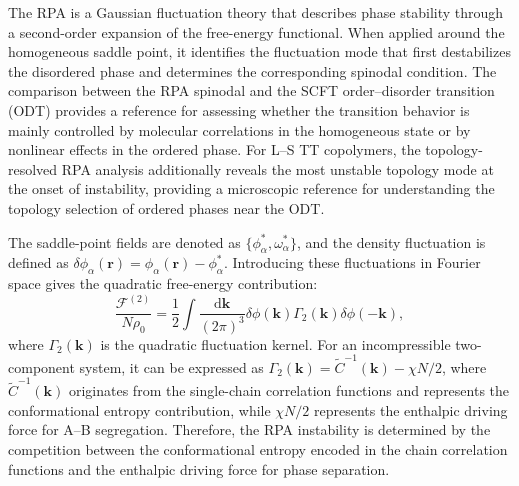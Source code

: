 
    The RPA is a Gaussian fluctuation theory that describes phase stability through a second-order expansion of the free-energy functional.
    When applied around the homogeneous saddle point, it identifies the fluctuation mode that first destabilizes the disordered phase and determines the corresponding spinodal condition.\cite{Matsen1996Unifying, Wang2008Microphase, Li2020Largely}
    The comparison between the RPA spinodal and the SCFT order--disorder transition (ODT) provides a reference for assessing whether the transition behavior is mainly controlled by molecular correlations in the homogeneous state or by nonlinear effects in the ordered phase.\cite{Li2021Simplicity, Sides2004Continuous}
    For L--S TT copolymers, the topology-resolved RPA analysis additionally reveals the most unstable topology mode at the onset of instability, providing a microscopic reference for understanding the topology selection of ordered phases near the ODT.\cite{Zhao2024Phase}


    The saddle-point fields are denoted as $\{\phi_\alpha^\ast,\omega_\alpha^\ast\}$, and the density fluctuation is defined as $\delta\phi_\alpha(\bm r)=\phi_\alpha(\bm r)-\phi_\alpha^\ast$.
    Introducing these fluctuations in Fourier space gives the quadratic free-energy contribution:
    \begin{equation}
        \frac{\mathcal F^{(2)}}{N\rho_0}
        =
        \frac12
        \int
        \frac{\mathrm d\bm k}{(2\pi)^3}
        \delta\phi(\bm k)
        \Gamma_2(\bm k)
        \delta\phi(-\bm k),
        \label{eq:RPAKernel}
    \end{equation}
    where $\Gamma_2(\bm k)$ is the quadratic fluctuation kernel.
    For an incompressible two-component system, it can be expressed as $\Gamma_2(\bm k)=\widetilde C^{-1}(\bm k)-\chi N/2$, where $\widetilde C^{-1}(\bm k)$ originates from the single-chain correlation functions and represents the conformational entropy contribution, while $\chi N/2$ represents the enthalpic driving force for A--B segregation.
    Therefore, the RPA instability is determined by the competition between the conformational entropy encoded in the chain correlation functions and the enthalpic driving force for phase separation.


